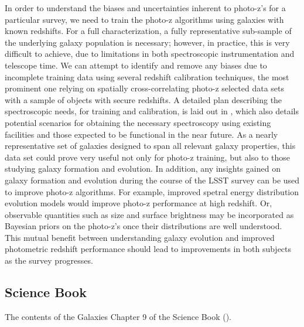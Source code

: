    In order to understand the biases and uncertainties inherent to photo-z's for a particular survey, we need to train the photo-z algorithms using galaxies with known redshifts.  For a full characterization, a fully representative sub-sample of the underlying galaxy population is necessary; however, in practice, this is very difficult to achieve, due to limitations in both spectroscopic instrumentation and telescope time.  We can attempt to identify and remove any biases due to incomplete training data using several redshift calibration techniques, the most prominent one relying on spatially cross-correlating photo-z selected data sets with a sample of objects with secure redshifts.  A detailed plan describing the spectroscopic needs, for training and calibration, is laid out in \citet[]{Newman2015}, which also details potential scenarios for obtaining the necessary spectroscopy using existing facilities and those expected to be functional in the near future.  As a nearly representative set of galaxies designed to span all relevant galaxy properties, this data set could prove very useful not only for photo-z training, but also to those studying galaxy formation and evolution.  In addition, any insights gained on galaxy formation and evolution during the course of the LSST survey can be used to improve photo-z algorithms.  For example, improved spetral energy distribution evolution models would improve photo-z performance at high redshift.  Or, observable quantities such as size and surface brightness may be incorporated as Bayesian priors on the photo-z's once their distributions are well understood.  This mutual benefit between understanding galaxy evolution and improved photometric redshift performance should lead to improvements in both subjects as the survey progresses.

\subsection{Science Book}
\label{sec:sci:gal:bkgnd:scibook}

The contents of the
Galaxies Chapter 9 of the Science Book (\citealt{LSSTSciBook}).

